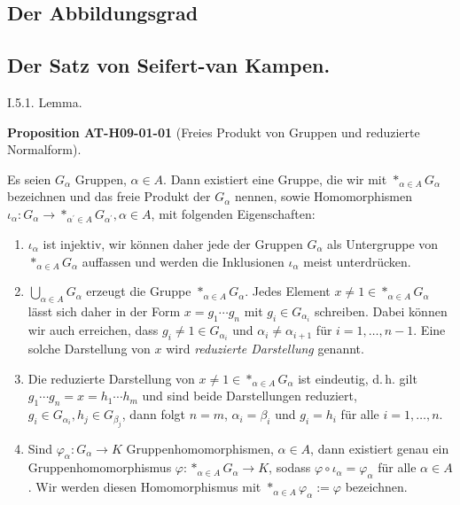 \documentclass[10pt, letterpaper]{article}
\newcommand{\CustomHeading}[3]{%
  \par\medskip\noindent%
  \textbf{#1 #2} \textnormal{(#3)}.\enskip%
}
\newenvironment{PROP}[2]{\begin{unitbox}\CustomHeading{Proposition}{#1}{#2}}{\end{unitbox}}
\begin{document}
\pagebreak

\subsection{Der Abbildungsgrad}



\pagebreak


\subsection{Der Satz von Seifert-van Kampen.}



I.5.1. Lemma. 


\begin{PROP}{AT-H09-01-01}{Freies Produkt von Gruppen und reduzierte Normalform}
Es seien $G_\alpha$ Gruppen, $\alpha \in A$. Dann existiert eine Gruppe, die wir mit $*_{\alpha \in A} G_\alpha$ bezeichnen und das freie Produkt der $G_\alpha$ nennen, sowie Homomorphismen $\iota_\alpha: G_\alpha \rightarrow *_{\alpha^{\prime} \in A} G_{\alpha^{\prime}}, \alpha \in A$, mit folgenden Eigenschaften:
\begin{enumerate}
  \item $\iota_\alpha$ ist injektiv, wir können daher jede der Gruppen $G_\alpha$ als Untergruppe von $*_{\alpha \in A} G_\alpha$ auffassen und werden die Inklusionen $\iota_\alpha$ meist unterdrücken.
  
  \item $\bigcup_{\alpha \in A} G_\alpha$ erzeugt die Gruppe $*_{\alpha \in A} G_\alpha$. Jedes Element $x \neq 1 \in *_{\alpha \in A} G_\alpha$ lässt sich daher in der Form $x = g_1 \cdots g_n$ mit $g_i \in G_{\alpha_i}$ schreiben. Dabei können wir auch erreichen, dass $g_i \neq 1 \in G_{\alpha_i}$ und $\alpha_i \neq \alpha_{i+1}$ für $i = 1, \ldots, n-1$. Eine solche Darstellung von $x$ wird \emph{reduzierte Darstellung} genannt.
  
  \item Die reduzierte Darstellung von $x \neq 1 \in *_{\alpha \in A} G_\alpha$ ist eindeutig, d.\,h. gilt $g_1 \cdots g_n = x = h_1 \cdots h_m$ und sind beide Darstellungen reduziert, $g_i \in G_{\alpha_i}, h_j \in G_{\beta_j}$, dann folgt $n = m$, $\alpha_i = \beta_i$ und $g_i = h_i$ für alle $i = 1, \ldots, n$.
  
  \item Sind $\varphi_\alpha: G_\alpha \rightarrow K$ Gruppenhomomorphismen, $\alpha \in A$, dann existiert genau ein Gruppenhomomorphismus $\varphi: *_{\alpha \in A} G_\alpha \rightarrow K$, sodass $\varphi \circ \iota_\alpha = \varphi_\alpha$ für alle $\alpha \in A$. Wir werden diesen Homomorphismus mit $*_{\alpha \in A} \varphi_\alpha := \varphi$ bezeichnen.
\end{enumerate}
\end{PROP}
\end{document}
